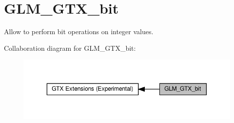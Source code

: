 \hypertarget{group__gtx__bit}{}\section{G\+L\+M\+\_\+\+G\+T\+X\+\_\+bit}
\label{group__gtx__bit}


Allow to perform bit operations on integer values.  


Collaboration diagram for G\+L\+M\+\_\+\+G\+T\+X\+\_\+bit\+:\nopagebreak
\begin{figure}[H]
\begin{center}
\leavevmode
\includegraphics[width=350pt]{group__gtx__bit}
\end{center}
\end{figure}
